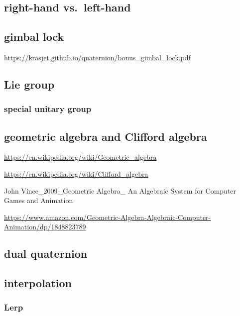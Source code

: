 \documentclass[
]{book}
\theoremstyle{definition}
\theoremstyle{definition}
\theoremstyle{definition}
\theoremstyle{definition}
\theoremstyle{remark}
\begin{document}
\subsection{right-hand vs.~left-hand}\label{right-hand-vs.-left-hand}

\subsection{gimbal lock}\label{gimbal-lock}

\url{https://krasjet.github.io/quaternion/bonus_gimbal_lock.pdf}

\subsection{Lie group}\label{lie-group}

\subsubsection{special unitary group}\label{special-unitary-group}

\subsection{geometric algebra and Clifford algebra}\label{geometric-algebra-and-clifford-algebra}

\url{https://en.wikipedia.org/wiki/Geometric_algebra}

\url{https://en.wikipedia.org/wiki/Clifford_algebra}

John Vince\_2009\_Geometric Algebra\_ An Algebraic System for Computer Games and Animation

\url{https://www.amazon.com/Geometric-Algebra-Algebraic-Computer-Animation/dp/1848823789}

\subsection{dual quaternion}\label{dual-quaternion}

\subsection{interpolation}\label{interpolation}

\subsubsection{Lerp}\label{lerp}
\end{document}
